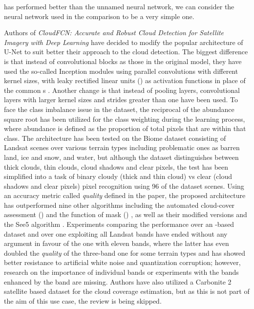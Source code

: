 has performed better than the unnamed neural network, we can consider the neural network used in the comparison to be a very simple one.

Authors of \textit{CloudFCN: Accurate and Robust Cloud Detection for Satellite Imagery with Deep Learning} have decided to modify the popular architecture of U-Net \cite{u-net} to suit better their approach to the cloud detection. The biggest difference is that instead of convolutional blocks as those in the original model, they have used the so-called Inception modules \cite{inception} using parallel convolutions with different kernel sizes, with leaky rectified linear units () \cite{leaky-relu} as activation functions in place of the common s \cite{relu}. Another change is that instead of pooling layers, convolutional layers with larger kernel sizes and strides greater than one have been used. To face the class imbalance issue in the dataset, the reciprocal of the abundance square root has been utilized for the class weighting during the learning process, where abundance is defined as the proportion of total pixels that are within that class. The architecture has been tested on the Biome dataset \cite{biome} consisting of Landsat scenes over various terrain types including problematic ones as barren land, ice and snow, and water, but although the dataset distinguishes between thick clouds, thin clouds, cloud shadows and clear pixels, the test has been simplified into a task of binary cloudy (thick and thin cloud) vs clear (cloud shadows and clear pixels) pixel recognition using 96 of the dataset scenes. Using an accuracy metric called \textit{quality} defined in the paper, the proposed architecture has outperformed nine other algorithms including the automated cloud-cover assessment () \cite{acca} and the function of mask () \cite{fmask}, as well as their modified versions and the See5 algorithm \cite{biome}. Experiments comparing the performance over an -based dataset and over one exploiting all Landsat bands have ended without any argument in favour of the one with eleven bands, where the latter has even doubled the \textit{quality} of the three-band one for some terrain types and has showed better resistance to artificial white noise and quantization corruption; however, research on the importance of individual bands or experiments with the  bands enhanced by the  band are missing. Authors have also utilized a Carbonite 2 satellite based dataset for the cloud coverage estimation, but as this is not part of the aim of this use case, the review is being skipped.

